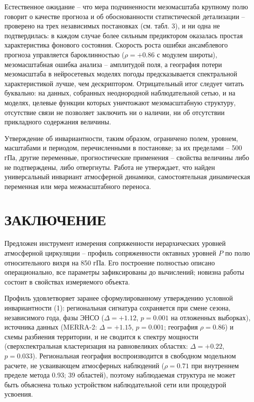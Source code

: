 \documentclass[12pt,a4paper]{article}
\begin{document}
Естественное ожидание -- что мера подчиненности мезомасштаба крупному полю говорит о качестве прогноза и об обоснованности статистической детализации -- проверено на трех независимых постановках (см. табл. 3), и ни одна не подтвердилась: в каждом случае более сильным предиктором оказалась простая характеристика фонового состояния. Скорость роста ошибки ансамблевого прогноза управляется бароклинностью ($\rho = +0.86$ с модулем широты), мезомасштабная ошибка анализа -- амплитудой поля, а география потери мезомасштаба в нейросетевых моделях погоды \cite{Lam2023,Bi2023,Price2025,Rasp2024} предсказывается спектральной характеристикой лучше, чем дескриптором. Отрицательный итог следует читать буквально: на данных, собранных неоднородной наблюдательной сетью, и на моделях, целевые функции которых уничтожают мезомасштабную структуру, отсутствие связи не позволяет заключить ни о наличии, ни об отсутствии прикладного содержания величины.

Утверждение об инвариантности, таким образом, ограничено полем, уровнем, масштабами и периодом, перечисленными в постановке; за их пределами -- 500 гПа, другие переменные, прогностические применения -- свойства величины либо не подтверждены, либо отвергнуты. Работа не утверждает, что найден универсальный инвариант атмосферной динамики, самостоятельная динамическая переменная или мера межмасштабного переноса.

\section{ЗАКЛЮЧЕНИЕ}

Предложен инструмент измерения сопряженности иерархических уровней атмосферной циркуляции -- профиль сопряженности октавных уровней $P$ по полю относительного вихря на 850 гПа. Его построение полностью описано операционально, все параметры зафиксированы до вычислений; новизна работы состоит в свойствах измеряемого объекта.

Профиль удовлетворяет заранее сформулированному утверждению условной инвариантности (1): региональная сигнатура сохраняется при смене сезона, независимого года, фазы ЭНСО ($\Delta = +1.12$, $p = 0.001$ на отложенных выборках), источника данных (MERRA-2: $\Delta = +1.15$, $p = 0.001$; география $\rho = 0.86$) и схемы разбиения территории, и не сводится к спектру мощности (сверхспектральная кластеризация на равновеликих областях: $\Delta = +0.22$, $p = 0.033$). Региональная география воспроизводится в свободном модельном расчете, не усваивающем атмосферных наблюдений ($\rho = 0.71$ при внутреннем пределе метода 0.93; 39 областей), поэтому наблюдаемая структура не может быть объяснена только устройством наблюдательной сети или процедурой усвоения.
\end{document}
